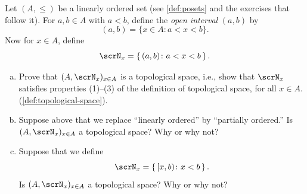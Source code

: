 \begin{exercise}
  Let $(A,\le)$ be  a linearly ordered set (see \cref{def:posets} and the exercises that follow it).
  For $a,b\in A$ with $a<b$, define the \emph{open interval} $(a, b)$ by
  \[
    (a, b)=\{x\in A \colon a<x<b\}.
  \]
  Now for $x\in A$, define
  \[
    \scrN_x = \left\{ \,  (a, b) \colon a<x<b \, \right\}.
  \]
  \begin{enumerate}[(a)]
  \item
    Prove that $(A, \scrN_x )_{x\in A}$ is a topological space, i.e., show that $\scrN_x$ satisfies properties (1)--(3) of the definition of topological space, for all $x\in A$.(\cref{def:topological-space}).
  \item
    Suppose above that we replace “linearly ordered” by “partially ordered.” Is $(A, \scrN_x )_{x\in A}$ a topological space?
    Why or why not?
  \item
    Suppose that we define
    \[
      \scrN_x = \left\{ \, [x, b) \colon x<b  \, \right\}.
    \]
    Is $(A, \scrN_x )_{x\in A}$ a topological space?
    Why or why not?
  \end{enumerate}
\end{exercise}

